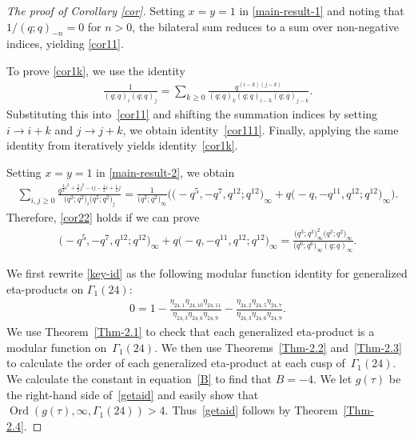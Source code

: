 \documentclass[pdftex]{sigma}
\numberwithin{equation}{section}
\theoremstyle{definition}
\begin{document}
\begin{proof}[The proof of Corollary \ref{cor}]
Setting $x=y=1$ in \eqref{main-result-1} and noting that $1/(q;q)_{-n}=0$ for $n>0$, the bilateral sum reduces to a sum over non-negative indices, yielding \eqref{cor11}.

To prove \eqref{cor1k}, we use the identity \cite[p.~20]{Andrews-1981}
\begin{align*}
\frac{1}{(q;q)_i(q;q)_j}=\sum_{k\geq0}\frac{q^{(i-k)(j-k)}}{(q;q)_k(q;q)_{i-k}(q;q)_{j-k}}.
\end{align*}
Substituting this into~\eqref{cor11} and shifting the summation indices by setting $i\rightarrow i+k$ and $j\rightarrow j+k$, we obtain identity~\eqref{cor111}. Finally, applying the same identity from \cite[p.~20]{Andrews-1981} iteratively yields identity~\eqref{cor1k}.

Setting $x=y=1$ in \eqref{main-result-2}, we obtain
\begin{align*}
\sum_{i,j\geq0}\frac{q^{\frac{3}{2}i^2+\frac{3}{2}j^2-ij-\frac{1}{2}i+\frac{1}{2}j}} {\bigl(q^2;q^2\bigr)_i\bigl(q^2;q^2\bigr)_j}=\frac{1}{\bigl(q^2;q^2\bigr)_{\infty}}
\bigl(\bigl(-q^5,-q^7,q^{12};q^{12}\bigr)_{\infty}+q\bigl(-q,-q^{11},q^{12};q^{12}\bigr)_{\infty}\bigr).
\end{align*}
Therefore, \eqref{cor22} holds if we can prove
\begin{align}\label{key-id}
\bigl(-q^5,-q^7,q^{12};q^{12}\bigr)_{\infty}+q\bigl(-q,-q^{11},q^{12};q^{12}\bigr)_{\infty}
=\frac{\bigl(q^3;q^3\bigr)^2_{\infty}\bigl(q^2;q^2\bigr)_{\infty}}{\bigl(q^6;q^6\bigr)_{\infty}(q;q)_{\infty}}.
\end{align}

We first rewrite \eqref{key-id} as the following modular function identity for generalized eta-products on $\Gamma_1(24)$:
\begin{align}\label{getaid}
0=1-\frac{\eta_{24,1}\eta_{24,10}\eta_{24,11}}{\eta_{24,3}\eta_{24,6}\eta_{24,9}}-\frac{\eta_{24,2}\eta_{24,5}\eta_{24,7}}{\eta_{24,3}\eta_{24,6}\eta_{24,9}}.
\end{align}
We use Theorem~\ref{Thm-2.1} to check that each generalized eta-product is a modular function on~$\Gamma_1(24)$. We then use Theorems~\ref{Thm-2.2} and~\ref{Thm-2.3} to calculate the order of each generalized eta-product at each cusp of~$\Gamma_1(24)$. We calculate the constant in equation~\eqref{B} to find that $B=-4$. We let $g(\tau)$ be the right-hand side of~\eqref{getaid} and easily show that $\operatorname{Ord}(g(\tau),\infty,\Gamma_1(24)) > 4$. Thus~\eqref{getaid} follows by Theorem~\ref{Thm-2.4}.


\end{proof}
\end{document}
